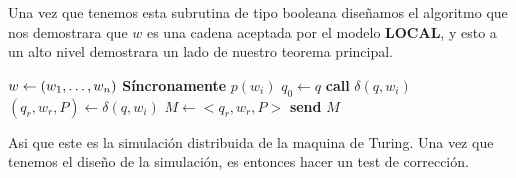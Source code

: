 \documentclass[10pt]{article}
\begin{document}
    Una vez que tenemos esta subrutina de tipo booleana diseñamos el algoritmo que nos demostrara que $w$ es una cadena
    aceptada por el modelo \textbf{LOCAL}, y esto a un alto nivel demostrara un lado de nuestro teorema principal.\\

    \begin{algorithm}
        \begin{algorithmic}
            \STATE $w\gets(w_{1},\mathellipsis, w_{n})$
            \STATE \textbf{Síncronamente}
               \STATE $p(w_{i})$
               \STATE $q_{0}\gets q$
                 \STATE \textbf{call} $\delta(q,w_{i})$
                 \STATE $(q_{r},w_{r},P) \gets \delta(q,w_{i})$
               \ENDWHILE
               \ELSE
                  \STATE $M \gets <q_{r},w_{r},P>$
                  \STATE \textbf{send} $M$
               \ENDIF
            \ENDFOR
        \end{algorithmic}
        \caption{$Simulate\char95 Algo\char95 TM(w,G,TM)$\label{lss}}
    \end{algorithm}
    Asi que este es la simulación distribuida de la maquina de Turing.
    Una vez que tenemos el diseño de la simulación, es entonces hacer un test de corrección.
    \\\\
\end{document}
